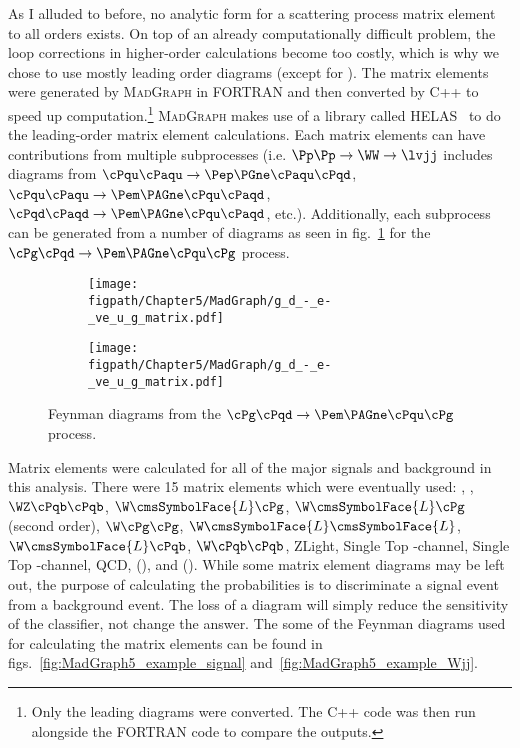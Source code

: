 As I alluded to before, no analytic form for a scattering process matrix element to all orders exists.
On top of an already computationally difficult problem, the loop corrections in higher-order calculations become too costly, which is why we chose to use mostly leading order diagrams (except for \Wjets).
The matrix elements were generated by \textsc{Mad}\textsc{Graph} in FORTRAN and then converted by C++ to speed up computation.\footnote{Only the leading diagrams were converted. The C++ code was then run alongside the FORTRAN code to compare the outputs.}
\textsc{Mad}\textsc{Graph} makes use of a library called HELAS~\cite{Murayama:1992gi} to do the leading-order matrix element calculations.
Each matrix elements can have contributions from multiple subprocesses (i.e. $\Pp\Pp\rightarrow\WW\rightarrow\lvjj$ includes diagrams from $\cPqu\cPaqu\rightarrow\Pep\PGne\cPaqu\cPqd$, $\cPqu\cPaqu\rightarrow\Pem\PAGne\cPqu\cPaqd$, $\cPqd\cPaqd\rightarrow\Pem\PAGne\cPqu\cPaqd$, etc.).
Additionally, each subprocess can be generated from a number of diagrams as seen in fig.~\ref{fig:MadGraph5_example_subdiagrams} for the $\cPg\cPqd\rightarrow\Pem\PAGne\cPqu\cPg$ process.

\begin{figure}[!hbtp]
    \centering
    \begin{subfigure}[t]{0.9\textwidth}
        \texttt{[image: \\figpath/Chapter5/MadGraph/g\_d\_-\_e-\_ve\_u\_g\_matrix.pdf]}
    \end{subfigure}

    \begin{subfigure}[t]{0.9\textwidth}
        \texttt{[image: \\figpath/Chapter5/MadGraph/g\_d\_-\_e-\_ve\_u\_g\_matrix.pdf]}
    \end{subfigure}
    \caption{Feynman diagrams from the $\cPg\cPqd\rightarrow\Pem\PAGne\cPqu\cPg$ process.}
    \label{fig:MadGraph5_example_subdiagrams}
\end{figure}

Matrix elements were calculated for all of the major signals and background in this analysis.
There were 15 matrix elements which were eventually used: \WW, \WZ, $\WZ\cPqb\cPqb$, $\W\cmsSymbolFace{L}\cPg$, $\W\cmsSymbolFace{L}\cPg$ (second order), $\W\cPg\cPg$, $\W\cmsSymbolFace{L}\cmsSymbolFace{L}$, $\W\cmsSymbolFace{L}\cPqb$, $\W\cPqb\cPqb$, ZLight, Single Top \cPqt-channel, Single Top \cPqs-channel, QCD, \ggH (\joinsym{\MH}{=}{125\gev}), and \WH (\joinsym{\MH}{=}{125\gev}).
While some matrix element diagrams may be left out, the purpose of calculating the probabilities is to discriminate a signal event from a background event.
The loss of a diagram will simply reduce the sensitivity of the classifier, not change the answer.
The some of the Feynman diagrams used for calculating the matrix elements can be found in figs.~\ref{fig:MadGraph5_example_signal} and~\ref{fig:MadGraph5_example_Wjj}.

